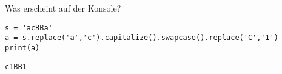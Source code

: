 \question[2] Was erscheint auf der Konsole?
\begin{lstlisting}
s = 'acBBa'
a = s.replace('a','c').capitalize().swapcase().replace('C','1')
print(a)
\end{lstlisting}
\begin{solutionbox}{2cm}
\begin{lstlisting}
c1BB1
\end{lstlisting}
\end{solutionbox}
